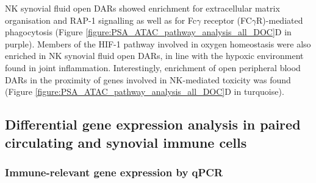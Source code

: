 NK synovial fluid open DARs showed enrichment for extracellular matrix organisation and RAP-1 signalling as well as for Fc$\gamma$ receptor (FC$\gamma$R)-mediated phagocytosis (Figure \ref{figure:PSA_ATAC_pathway_analysis_all_DOC}D in purple). Members of the HIF-1 pathway involved in oxygen homeostasis were also enriched in NK synovial fluid open DARs, in line with the hypoxic environment found in joint inflammation. Interestingly, enrichment of open peripheral blood DARs in the proximity of genes involved in NK-mediated toxicity was found (Figure \ref{figure:PSA_ATAC_pathway_analysis_all_DOC}D in turquoise). 







\subsection{Differential gene expression analysis in paired circulating and synovial immune cells}

\subsubsection{Immune-relevant gene expression by qPCR}

